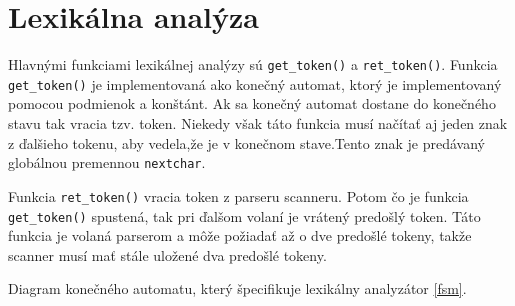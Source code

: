 \documentclass[a4paper, 11pt]{article}
\begin{document}
\section{Lexikálna analýza}
Hlavnými funkciami lexikálnej analýzy sú \texttt{get\_token()} a \texttt{ret\_token()}. Funkcia \texttt{get\_token()} je implementovaná ako konečný automat, ktorý je implementovaný pomocou podmienok a konštánt. Ak sa konečný automat dostane do konečného stavu tak vracia tzv. token. Niekedy však táto funkcia musí načítať aj jeden znak z ďalšieho tokenu, aby vedela,že je v konečnom stave.Tento znak je predávaný globálnou premennou \texttt{nextchar}. 


Funkcia \texttt{ret\_token()} vracia token z parseru scanneru. Potom čo je funkcia \texttt{get\_token()} spustená, tak pri ďalšom volaní je vrátený predošlý token. Táto funkcia je volaná parserom a môže požiadať až o dve predošlé tokeny, takže scanner musí mať stále uložené dva predošlé tokeny.

Diagram konečného automatu, který špecifikuje lexikálny analyzátor \ref{fsm}.
\end{document}
